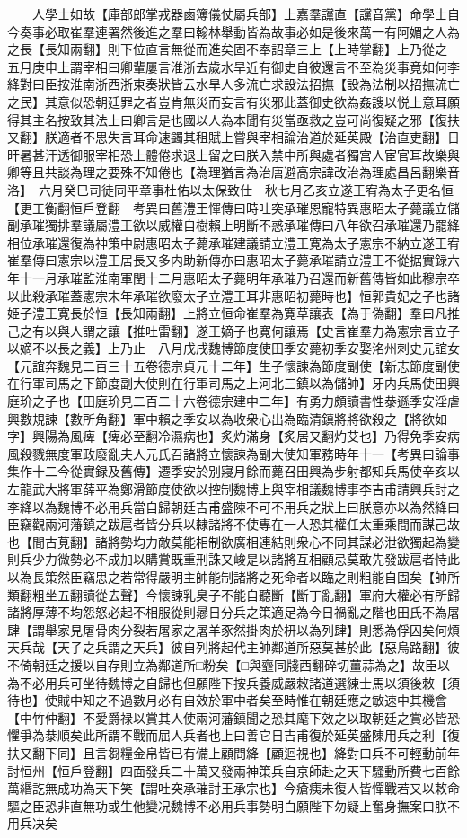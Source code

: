 　　人學士如故【庫部郎掌戎器鹵簿儀仗屬兵部】上嘉羣讜直【讜音黨】命學士自今奏事必取崔羣連署然後進之羣曰翰林舉動皆為故事必如是後來萬一有阿媚之人為之長【長知兩翻】則下位直言無從而進矣固不奉詔章三上【上時掌翻】上乃從之　五月庚申上謂宰相曰卿輩屢言淮浙去歲水旱近有御史自彼還言不至為災事竟如何李絳對曰臣按淮南浙西浙東奏狀皆云水旱人多流亡求設法招撫【設為法制以招撫流亡之民】其意似恐朝廷罪之者豈肯無災而妄言有災邪此蓋御史欲為姦謏以悦上意耳願得其主名按致其法上曰卿言是也國以人為本聞有災當亟救之豈可尚復疑之邪【復扶又翻】朕適者不思失言耳命速蠲其租賦上嘗與宰相論治道於延英殿【治直吏翻】日旰暑甚汗透御服宰相恐上體倦求退上留之曰朕入禁中所與處者獨宫人宦官耳故樂與卿等且共談為理之要殊不知倦也【為理猶言為治唐避高宗諱改治為理處昌呂翻樂音洛】　六月癸巳司徒同平章事杜佑以太保致仕　秋七月乙亥立遂王宥為太子更名恒【更工衡翻恒戶登翻　考異曰舊澧王惲傳曰時吐突承璀恩寵特異惠昭太子薨議立儲副承璀獨排羣議屬澧王欲以威權自樹賴上明斷不惑承璀傳曰八年欲召承璀還乃罷絳相位承璀還復為神策中尉惠昭太子薨承璀建議請立澧王寛為太子憲宗不納立遂王宥崔羣傳曰憲宗以澧王居長又多内助新傳亦曰惠昭太子薨承璀請立澧王不從据實録六年十一月承璀監淮南軍閏十二月惠昭太子薨明年承璀乃召還而新舊傳皆如此穆宗卒以此殺承璀蓋憲宗末年承璀欲廢太子立澧王耳非惠昭初薨時也】恒郭貴妃之子也諸姫子澧王寛長於恒【長知兩翻】上將立恒命崔羣為寛草讓表【為于偽翻】羣曰凡推己之有以與人謂之讓【推吐雷翻】遂王嫡子也寛何讓焉【史言崔羣力為憲宗言立子以嫡不以長之義】上乃止　八月戊戌魏博節度使田季安薨初季安娶洺州刺史元誼女【元誼奔魏見二百三十五卷德宗貞元十二年】生子懷諫為節度副使【新志節度副使在行軍司馬之下節度副大使則在行軍司馬之上河北三鎮以為儲帥】牙内兵馬使田興庭玠之子也【田庭玠見二百二十六卷德宗建中二年】有勇力頗讀書性㳟遜季安淫虐興數規諫【數所角翻】軍中賴之季安以為收衆心出為臨清鎮將將欲殺之【將欲如字】興陽為風痺【痺必至翻冷濕病也】炙灼滿身【炙居又翻灼艾也】乃得免季安病風殺戮無度軍政廢亂夫人元氏召諸將立懷諫為副大使知軍務時年十一【考異曰論事集作十二今從實録及舊傳】遷季安於别寢月餘而薨召田興為步射都知兵馬使辛亥以左龍武大將軍薛平為鄭滑節度使欲以控制魏博上與宰相議魏博事李吉甫請興兵討之李絳以為魏博不必用兵當自歸朝廷吉甫盛陳不可不用兵之狀上曰朕意亦以為然絳曰臣竊觀兩河藩鎮之跋扈者皆分兵以隸諸將不使專在一人恐其權任太重乘間而謀己故也【間古莧翻】諸將勢均力敵莫能相制欲廣相連結則衆心不同其謀必泄欲獨起為變則兵少力微勢必不成加以購賞既重刑誅又峻是以諸將互相顧忌莫敢先發跋扈者恃此以為長策然臣竊思之若常得嚴明主帥能制諸將之死命者以臨之則粗能自固矣【帥所類翻粗坐五翻讀從去聲】今懷諫乳臭子不能自聽斷【斷丁亂翻】軍府大權必有所歸諸將厚薄不均怨怒必起不相服從則曏日分兵之策適足為今日禍亂之階也田氏不為屠肆【謂舉家見屠骨肉分裂若屠家之屠羊豕然掛肉於枅以為列肆】則悉為俘囚矣何煩天兵哉【天子之兵謂之天兵】彼自列將起代主帥鄰道所惡莫甚於此【惡烏路翻】彼不倚朝廷之援以自存則立為鄰道所□粉矣【□與韲同牋西翻碎切薑蒜為之】故臣以為不必用兵可坐待魏博之自歸也但願陛下按兵養威嚴敕諸道選練士馬以須後敕【須待也】使賊中知之不過數月必有自效於軍中者矣至時惟在朝廷應之敏速中其機會【中竹仲翻】不愛爵禄以賞其人使兩河藩鎮聞之恐其麾下效之以取朝廷之賞必皆恐懼爭為㳟順矣此所謂不戰而屈人兵者也上曰善它日吉甫復於延英盛陳用兵之利【復扶又翻下同】且言芻糧金帛皆已有備上顧問絳【顧迴視也】絳對曰兵不可輕動前年討恒州【恒戶登翻】四面發兵二十萬又發兩神策兵自京師赴之天下騷動所費七百餘萬緡訖無成功為天下笑【謂吐突承璀討王承宗也】今瘡痍未復人皆憚戰若又以敕命驅之臣恐非直無功或生他變况魏博不必用兵事勢明白願陛下勿疑上奮身撫案曰朕不用兵决矣